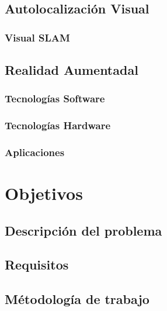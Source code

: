 \documentclass[a4paper, 12pt]{book}
\begin{document}
\section{Autolocalización Visual}
\label{sec:autolocalizacionvisual}

\subsection{Visual SLAM}
\label{subsec:visualslam}

\section{Realidad Aumentadal}
\label{sec:realidadaumentada}

\subsection{Tecnologías Software}
\label{subsec:tecnosoftware}

\subsection{Tecnologías Hardware}
\label{subsec:tecnohardware}

\subsection{Aplicaciones}
\label{subsec:raaplicaciones}

\chapter{Objetivos}
\label{sec:objetivos}

\section{Descripción del problema}
\label{subsec:descripcionproblema}

\section{Requisitos}
\label{subsec:requisitos}

\section{Métodología de trabajo}
\label{subsec:metodologiadetrabajo}
\end{document}
